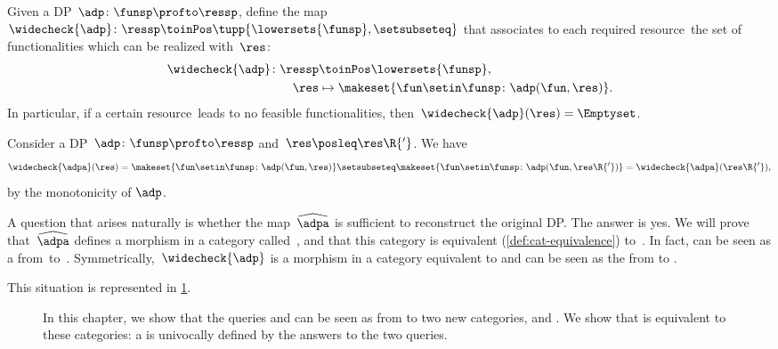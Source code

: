 \begin{definition}
    \label{def:rtoF-dp}
    Given a DP~$\adp\colon\funsp\profto\ressp$, define the map~$\widecheck{\adp} \colon \ressp\toinPos  \tupp{\lowersets{\funsp}, \setsubseteq}$ that associates to each required resource~\res the set of functionalities which can be realized with~$\res$:
    \begin{equation}
        \begin{aligned}
            \widecheck{\adp}\colon \ressp & \toinPos \lowersets{\funsp}, \\
            \res                      & \mapsto \makeset{ \fun \setin \funsp \colon \adp(\fun, \res)}.
        \end{aligned}
    \end{equation}
    In particular, if a certain resource~\res leads to no feasible functionalities, then~$\widecheck{\adp}(\res)=\Emptyset$.
\end{definition}

\begin{remark}[Monotonicity]
    Consider a DP~$\adp\colon\funsp\profto\ressp$ and~$\res\posleq \res\R{'}$.
    We have
    \begin{equation}
            \widecheck{\adpa}(\res) =\makeset{ \fun \setin \funsp \colon \adp(\fun, \res)} \setsubseteq \makeset{ \fun \setin \funsp \colon \adp(\fun, \res\R{'})} =\widecheck{\adpa}(\res\R{'}),
    \end{equation}
    by the monotonicity of $\adp$. 
\end{remark}

A question that arises naturally is whether the map~$\widehat{\adpa}$ is sufficient to reconstruct the original DP.
The answer is yes.
We will prove that~$\widehat{\adpa}$ defines a morphism in a category called~\UPos, and that this category is equivalent (\cref{def:cat-equivalence}) to~\DP.
In fact, \FixFunMinRes can be seen as a  from~\DP to~\UPos.
Symmetrically,~$\widecheck{\adp}$ is a morphism in a category \LPos equivalent to \DP and \FixResMaxFun can be seen as the  from \DP to \LPos.

This situation is represented in \cref{fig:upos_lpos_dp}.

\begin{figure}[tbh]
    \centering
    \caption{In this chapter, we show that the queries \FixResMaxFun and \FixFunMinRes
        can be seen as  from \DP to two new categories, \UPos and \LPos.
        We show that \DP is equivalent to these categories: a \DP is univocally
        defined by the answers to the two queries.
    }
    \label{fig:upos_lpos_dp}
\end{figure}

